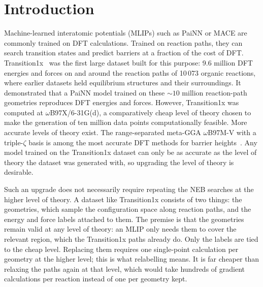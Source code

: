 \chapter{Introduction}
\label{ch:introduction}


Machine-learned interatomic potentials (MLIPs) such as PaiNN or MACE
are commonly trained on DFT calculations. Trained on reaction paths,
they can search transition states and predict barriers at a fraction
of the cost of DFT. Transition1x~\cite{schreiner2022} was the first
large dataset built for this purpose: 9.6 million DFT energies and
forces on and around the reaction paths of 10\,073 organic reactions,
where earlier datasets held equilibrium structures and their
surroundings. It demonstrated that a PaiNN model trained on these
${\sim}10$ million reaction-path geometries reproduces DFT energies
and forces. However,
Transition1x was computed at \mbox{$\omega$B97X/6-31G(d)}, a
comparatively cheap level of theory chosen to make the generation of
ten million data points computationally feasible. More accurate
levels of theory exist. The range-separated
meta-GGA $\omega$B97M-V with a triple-$\zeta$ basis is among the most
accurate DFT methods for barrier heights~\cite{mardirossian2016,
goerigk2017}. Any model trained on the Transition1x dataset can only
be as accurate as the level of theory the dataset was generated with,
so upgrading the level of theory is desirable.

Such an upgrade does not necessarily require repeating the NEB searches at the
higher level of theory. A dataset like Transition1x consists of two
things: the geometries, which sample the configuration space along
reaction paths, and the energy and force labels attached to them. The
premise is that the geometries remain valid at any level of theory:
an MLIP only needs them to cover the relevant region, which the
Transition1x paths already do. Only the labels are tied to the cheap
level. Replacing them requires one single-point calculation per geometry at
the higher level; this is what relabelling means. It is far cheaper
than relaxing the paths again at that level, which would take hundreds
of gradient calculations per reaction instead of one per geometry
kept.

